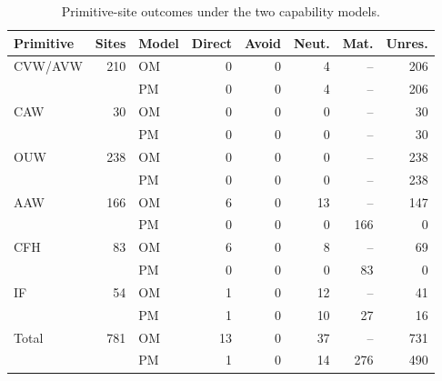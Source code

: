 \begin{table}[!ht]
  \centering
  \scriptsize
  \setlength{\tabcolsep}{3pt}
  \renewcommand{\arraystretch}{1.05}
  \begin{tabular}{@{}lrlrrrrr@{}}
    \toprule
    \textbf{Primitive} & \textbf{Sites} & \textbf{Model} & \textbf{Direct} & \textbf{Avoid} & \textbf{Neut.} & \textbf{Mat.} & \textbf{Unres.} \\
    \midrule
    CVW/AVW & 210 & OM & 0 & 0 & 4 & -- & 206 \\
            &       & PM & 0 & 0 & 4 & -- & 206 \\
    CAW     & 30 & OM & 0 & 0 & 0 & -- & 30 \\
            &       & PM & 0 & 0 & 0 & -- & 30 \\
    OUW     & 238 & OM & 0 & 0 & 0 & -- & 238 \\
            &       & PM & 0 & 0 & 0 & -- & 238 \\
    AAW     & 166 & OM & 6 & 0 & 13 & -- & 147 \\
            &       & PM & 0 & 0 & 0 & 166 & 0 \\
    CFH     & 83 & OM & 6 & 0 & 8 & -- & 69 \\
            &       & PM & 0 & 0 & 0 & 83 & 0 \\
    IF      & 54 & OM & 1 & 0 & 12 & -- & 41 \\
            &       & PM & 1 & 0 & 10 & 27 & 16 \\
    \midrule
    Total   & 781 & OM & 13 & 0 & 37 & -- & 731 \\
            &       & PM & 1 & 0 & 14 & 276 & 490 \\
    \bottomrule
  \end{tabular}
  \caption{Primitive-site outcomes under the two capability models.}
  \label{tab:primitive-usability-breakdown}
\end{table}
